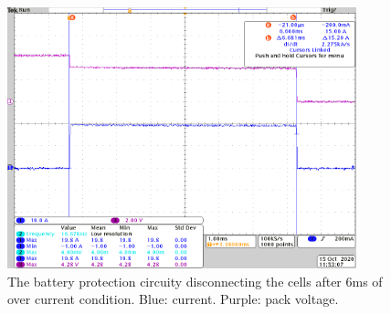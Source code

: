 \documentclass{article}
\begin{document}
\begin{figure}[H]
	\centering
	\includegraphics[width=0.9\textwidth]{images/over-current.png}
	\caption{The battery protection circuity disconnecting the cells after 6ms of over current condition. Blue: current. Purple: pack voltage.}
	\label{fig:over-current}
\end{figure}




























\appendix
\end{document}
